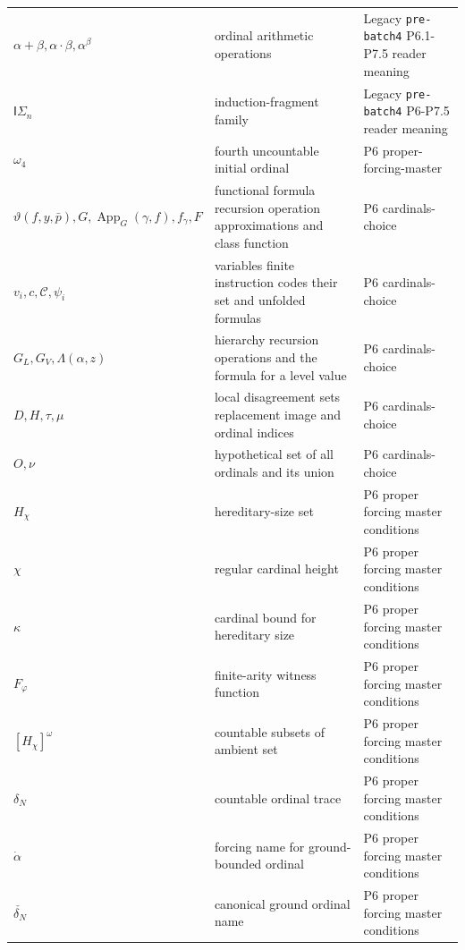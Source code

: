 \begin{longtable}{@{}p{}p{}p{}@{}}
\(\alpha+\beta,\allowbreak \alpha\cdot\beta,\allowbreak \alpha^\beta\) & ordinal arithmetic operations & Legacy \texttt{pre-\allowbreak{}batch4} P6.\allowbreak{}1-\allowbreak{}P7.\allowbreak{}5 reader meaning \\
\(\mathsf I\Sigma_n\) & induction-fragment family & Legacy \texttt{pre-\allowbreak{}batch4} P6-\allowbreak{}P7.\allowbreak{}5 reader meaning \\
\(\omega_4\) & fourth uncountable initial ordinal & P6 proper-\allowbreak{}forcing-\allowbreak{}master \\
\(\vartheta(f,\allowbreak y,\allowbreak \bar p),\allowbreak G,\allowbreak \operatorname{App}_G(\gamma,\allowbreak f),\allowbreak f_\gamma,\allowbreak F\) & functional formula recursion operation approximations and class function & P6 cardinals-\allowbreak{}choice \\
\(v_i,\allowbreak c,\allowbreak \mathcal C,\allowbreak \psi_i\) & variables finite instruction codes their set and unfolded formulas & P6 cardinals-\allowbreak{}choice \\
\(G_L,\allowbreak G_V,\allowbreak \Lambda(\alpha,\allowbreak z)\) & hierarchy recursion operations and the formula for a level value & P6 cardinals-\allowbreak{}choice \\
\(D,\allowbreak H,\allowbreak \tau,\allowbreak \mu\) & local disagreement sets replacement image and ordinal indices & P6 cardinals-\allowbreak{}choice \\
\(O,\allowbreak \nu\) & hypothetical set of all ordinals and its union & P6 cardinals-\allowbreak{}choice \\
\(H_\chi\) & hereditary-size set & P6 proper forcing master conditions \\
\(\chi\) & regular cardinal height & P6 proper forcing master conditions \\
\(\kappa\) & cardinal bound for hereditary size & P6 proper forcing master conditions \\
\(F_\varphi\) & finite-arity witness function & P6 proper forcing master conditions \\
\([H_\chi]^\omega\) & countable subsets of ambient set & P6 proper forcing master conditions \\
\(\delta_N\) & countable ordinal trace & P6 proper forcing master conditions \\
\(\dot\alpha\) & forcing name for ground-bounded ordinal & P6 proper forcing master conditions \\
\(\check{\delta_N}\) & canonical ground ordinal name & P6 proper forcing master conditions \\

\end{longtable}
